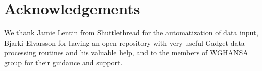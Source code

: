 \documentclass[review]{elsarticle}
\begin{document}
% 
% 
% 
% 
% 
% 
% 
% 
% 
% 
% 
% 
% 
% 
% 
% 
\newpage

\section{Acknowledgements}
We thank Jamie Lentin from Shuttlethread for the automatization of data input,  Bjarki Elvarsson for having an open repository with very useful Gadget data processing routines and his valuable help, and to the members of WGHANSA group for their guidance and support.
\end{document}
